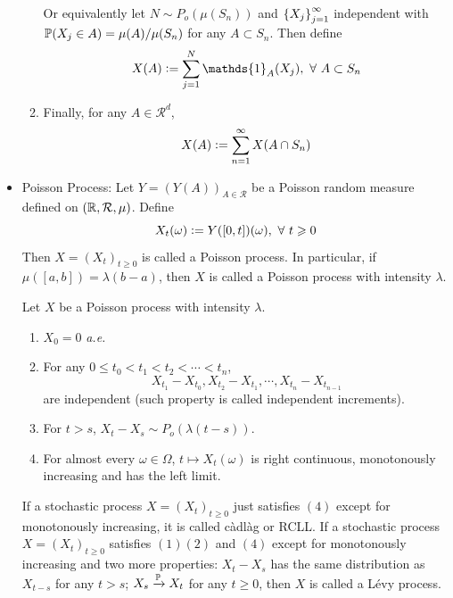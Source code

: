 \documentclass[a4paper,12pt]{article}
\begin{document}
\begin{itemize}
\begin{enumerate}[label=\Roman*.]
    \noindent Or equivalently let $N \sim P_o(\mu(S_n))$ and $\left\{X_j\right\}_{j=1}^{\infty}$ independent with $\mathbb{P}(X_j \in A) = \mu(A) / \mu(S_n)$ for any $A \subset S_n$. Then define
    \begin{equation*}
      X(A) \defeq \sum_{j=1}^N\mathds{1}_{A}(X_j),~\forall~A\subset S_n
    \end{equation*}

    \item Finally, for any $A \in \mathcal{R}^d$,
    \begin{equation*}
      X(A) \vcentcolon= \sum_{n=1}^{\infty}X(A \cap S_n)
    \end{equation*}
  \end{enumerate}

  \item Poisson Process: Let $Y=(Y(A))_{A \in \mathcal{R}}$ be a Poisson random measure defined on $(\mathbb{R}, \mathcal{R}, \mu)$. Define
  \begin{equation*}
    X_t(\omega) \vcentcolon= Y([0,t])(\omega),~\forall~t\geqslant 0
  \end{equation*}
  Then $X= (X_t)_{t\geqslant 0}$ is called a Poisson process. In particular, if $\mu([a,b]) = \lambda (b-a)$, then $X$ is called a Poisson process with intensity $\lambda$.

  \begin{thm}
    Let $X$ be a Poisson process with intensity $\lambda$.
    \begin{enumerate}[label=(\arabic*)]
      \item $X_0 = 0$ \emph{a.e.}
      \item For any $0\leqslant t_0 < t_1 < t_2 < \cdots < t_n$,
      \begin{equation*}
        X_{t_1}-X_{t_0},X_{t_2}-X_{t_1},\cdots,X_{t_n}-X_{t_{n-1}}
      \end{equation*}
      are independent (such property is called independent increments).
      \item For $t > s$, $X_t - X_s \sim P_o(\lambda(t-s))$.
      \item For almost every $\omega \in \Omega$, $t \mapsto X_t(\omega)$ is right continuous, monotonously increasing and has the left limit.
    \end{enumerate}
  \end{thm}
  \begin{rmk}
    If a stochastic process $X=(X_t)_{t \geqslant 0}$ just satisfies $(4)$ except for monotonously increasing, it is called c\`adl\`ag or RCLL. If a stochastic process $X=(X_t)_{t \geqslant 0}$ satisfies $(1)(2)$ and $(4)$ except for monotonously increasing and two more properties: $X_t - X_s$ has the same distribution as $X_{t-s}$ for any $t > s$; $X_s \xrightarrow{\mathbb{P}}X_t$ for any $t \geqslant 0$, then $X$ is called a L\'evy process.
  \end{rmk}


\end{itemize}
\end{document}

